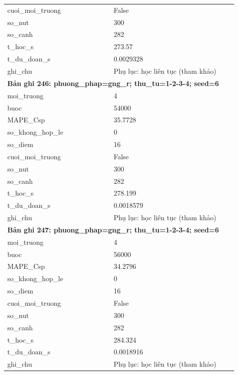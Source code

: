 \begin{longtable}{p{0.43\linewidth}p{0.50\linewidth}}
cuoi\_\allowbreak moi\_\allowbreak truong & False \\
so\_\allowbreak nut & 300 \\
so\_\allowbreak canh & 282 \\
t\_\allowbreak hoc\_\allowbreak s & 273.57 \\
t\_\allowbreak du\_\allowbreak doan\_\allowbreak s & 0.0029328 \\
ghi\_\allowbreak chu & Phụ lục: học liên tục (tham khảo) \\
\midrule
\multicolumn{2}{p{0.95\linewidth}}{\textbf{Bản ghi 246: phuong\_phap=gng\_r; thu\_tu=1-2-3-4; seed=6}} \\
moi\_\allowbreak truong & 4 \\
buoc & 54000 \\
MAPE\_\allowbreak Csp & 35.7728 \\
so\_\allowbreak khong\_\allowbreak hop\_\allowbreak le & 0 \\
so\_\allowbreak diem & 16 \\
cuoi\_\allowbreak moi\_\allowbreak truong & False \\
so\_\allowbreak nut & 300 \\
so\_\allowbreak canh & 282 \\
t\_\allowbreak hoc\_\allowbreak s & 278.199 \\
t\_\allowbreak du\_\allowbreak doan\_\allowbreak s & 0.0018579 \\
ghi\_\allowbreak chu & Phụ lục: học liên tục (tham khảo) \\
\midrule
\multicolumn{2}{p{0.95\linewidth}}{\textbf{Bản ghi 247: phuong\_phap=gng\_r; thu\_tu=1-2-3-4; seed=6}} \\
moi\_\allowbreak truong & 4 \\
buoc & 56000 \\
MAPE\_\allowbreak Csp & 34.2796 \\
so\_\allowbreak khong\_\allowbreak hop\_\allowbreak le & 0 \\
so\_\allowbreak diem & 16 \\
cuoi\_\allowbreak moi\_\allowbreak truong & False \\
so\_\allowbreak nut & 300 \\
so\_\allowbreak canh & 282 \\
t\_\allowbreak hoc\_\allowbreak s & 284.324 \\
t\_\allowbreak du\_\allowbreak doan\_\allowbreak s & 0.0018916 \\
ghi\_\allowbreak chu & Phụ lục: học liên tục (tham khảo) \\

\end{longtable}
